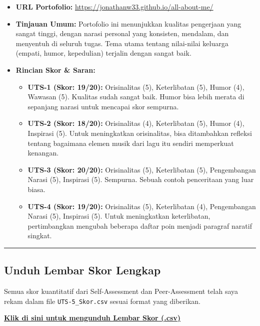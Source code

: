 \documentclass[
  letterpaper,
  DIV=11,
  numbers=noendperiod]{scrreprt}
\providecommand{\tightlist}{%
  \setlength{\itemsep}{0pt}\setlength{\parskip}{0pt}}
\begin{document}
\begin{itemize}
\tightlist
\item
  \textbf{URL Portofolio:}
  \url{https://jonathanw33.github.io/all-about-me/}
\item
  \textbf{Tinjauan Umum:} Portofolio ini menunjukkan kualitas pengerjaan
  yang sangat tinggi, dengan narasi personal yang konsisten, mendalam,
  dan menyentuh di seluruh tugas. Tema utama tentang nilai-nilai
  keluarga (empati, humor, kepedulian) terjalin dengan sangat baik.
\item
  \textbf{Rincian Skor \& Saran:}

  \begin{itemize}
  \tightlist
  \item
    \textbf{UTS-1 (Skor: 19/20):} Orisinalitas (5), Keterlibatan (5),
    Humor (4), Wawasan (5). Kualitas sudah sangat baik. Humor bisa lebih
    merata di sepanjang narasi untuk mencapai skor sempurna.
  \item
    \textbf{UTS-2 (Skor: 18/20):} Orisinalitas (4), Keterlibatan (5),
    Humor (4), Inspirasi (5). Untuk meningkatkan orisinalitas, bisa
    ditambahkan refleksi tentang bagaimana elemen musik dari lagu itu
    sendiri memperkuat kenangan.
  \item
    \textbf{UTS-3 (Skor: 20/20):} Orisinalitas (5), Keterlibatan (5),
    Pengembangan Narasi (5), Inspirasi (5). Sempurna. Sebuah contoh
    penceritaan yang luar biasa.
  \item
    \textbf{UTS-4 (Skor: 19/20):} Orisinalitas (5), Keterlibatan (4),
    Pengembangan Narasi (5), Inspirasi (5). Untuk meningkatkan
    keterlibatan, pertimbangkan mengubah beberapa daftar poin menjadi
    paragraf naratif singkat.
  \end{itemize}
\end{itemize}

\begin{center}\rule{0.5\linewidth}{0.5pt}\end{center}

\subsection{Unduh Lembar Skor Lengkap}\label{unduh-lembar-skor-lengkap}

Semua skor kuantitatif dari Self-Assessment dan Peer-Assessment telah
saya rekam dalam file \texttt{UTS-5\_Skor.csv} sesuai format yang
diberikan.

\href{./UTS-5_Skor.csv}{\textbf{Klik di sini untuk mengunduh Lembar Skor
(.csv)}}
\end{document}
